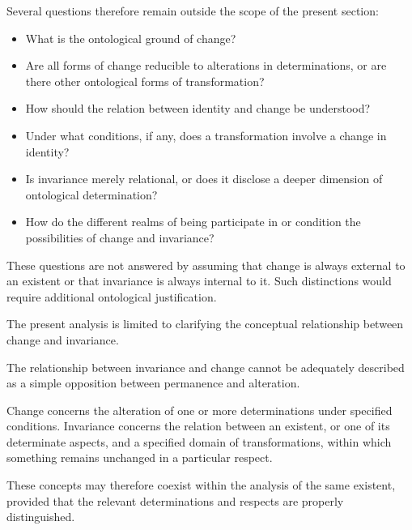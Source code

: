 Several questions therefore remain
outside the scope of the present
section:

\begin{itemize}
    \item What is the ontological ground
    of change?

    \item Are all forms of change
    reducible to alterations in
    determinations, or are there
    other ontological forms of
    transformation?

    \item How should the relation
    between identity and change
    be understood?

    \item Under what conditions,
    if any, does a transformation
    involve a change in identity?

    \item Is invariance merely relational,
    or does it disclose a deeper
    dimension of ontological
    determination?

    \item How do the different realms
    of being participate in or
    condition the possibilities
    of change and invariance?
\end{itemize}

These questions are not answered
by assuming that change is always
external to an existent or that
invariance is always internal to it.
Such distinctions would require
additional ontological justification.

The present analysis is limited to
clarifying the conceptual relationship
between change and invariance.


The relationship between invariance
and change cannot be adequately
described as a simple opposition
between permanence and alteration.

Change concerns the alteration
of one or more determinations under
specified conditions. Invariance
concerns the relation between an
existent, or one of its determinate
aspects, and a specified domain of
transformations, within which
something remains unchanged in
a particular respect.

These concepts may therefore coexist
within the analysis of the same
existent, provided that the relevant
determinations and respects are
properly distinguished.


